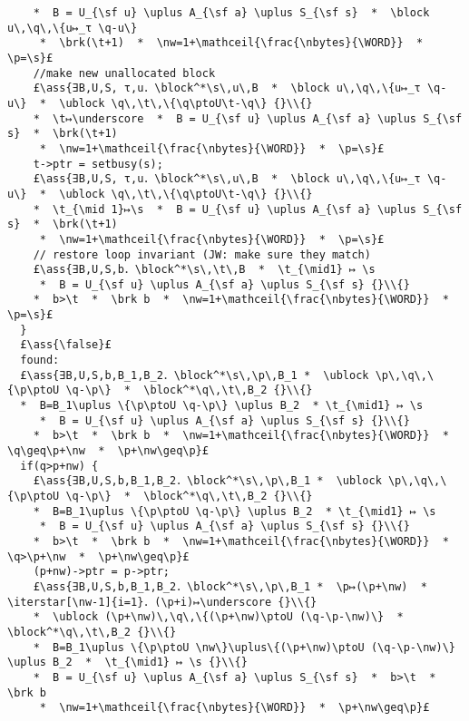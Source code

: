 \documentclass[12pt,a4paper]{article}
\makeatletter
\newcommand{\ml}[2][t]{\mbox{\mdseries\begin{tabular}[#1]{@{}L@{}}#2\end{tabular}}}
\newcommand{\ass}[1]{\ensuremath{{\color{blue}\left\{\ml[c]{#1}\right\}}}}
\newcommand{\iterstar}[2][]{\text{\LARGE $*$}^{#1}_{#2}}
\makeatother
\begin{document}
\begin{lstlisting}
    *  B = U_{\sf u} \uplus A_{\sf a} \uplus S_{\sf s}  *  \block u\,\q\,\{u↦_τ \q-u\} 
     *  \brk(\t+1)  *  \nw=1+\mathceil{\frac{\nbytes}{\WORD}}  *  \p=\s}£
    //make new unallocated block
    £\ass{∃B,U,S, τ,u．\block^*\s\,u\,B  *  \block u\,\q\,\{u↦_τ \q-u\}  *  \ublock \q\,\t\,\{\q\ptoU\t-\q\} {}\\{} 
    *  \t↦\underscore  *  B = U_{\sf u} \uplus A_{\sf a} \uplus S_{\sf s}  *  \brk(\t+1) 
     *  \nw=1+\mathceil{\frac{\nbytes}{\WORD}}  *  \p=\s}£
    t->ptr = setbusy(s);
    £\ass{∃B,U,S, τ,u．\block^*\s\,u\,B  *  \block u\,\q\,\{u↦_τ \q-u\}  *  \ublock \q\,\t\,\{\q\ptoU\t-\q\} {}\\{} 
    *  \t_{\mid 1}↦\s  *  B = U_{\sf u} \uplus A_{\sf a} \uplus S_{\sf s}  *  \brk(\t+1) 
     *  \nw=1+\mathceil{\frac{\nbytes}{\WORD}}  *  \p=\s}£
    // restore loop invariant (JW: make sure they match)
    £\ass{∃B,U,S,b．\block^*\s\,\t\,B  *  \t_{\mid1} ↦ \s 
     *  B = U_{\sf u} \uplus A_{\sf a} \uplus S_{\sf s} {}\\{}
    *  b>\t  *  \brk b  *  \nw=1+\mathceil{\frac{\nbytes}{\WORD}}  *  \p=\s}£
  }
  £\ass{\false}£
  found:
  £\ass{∃B,U,S,b,B_1,B_2．\block^*\s\,\p\,B_1 *  \ublock \p\,\q\,\{\p\ptoU \q-\p\}  *  \block^*\q\,\t\,B_2 {}\\{}
  *  B=B_1\uplus \{\p\ptoU \q-\p\} \uplus B_2  * \t_{\mid1} ↦ \s 
     *  B = U_{\sf u} \uplus A_{\sf a} \uplus S_{\sf s} {}\\{}
    *  b>\t  *  \brk b  *  \nw=1+\mathceil{\frac{\nbytes}{\WORD}}  *  \q\geq\p+\nw  *  \p+\nw\geq\p}£  
  if(q>p+nw) {
    £\ass{∃B,U,S,b,B_1,B_2．\block^*\s\,\p\,B_1 *  \ublock \p\,\q\,\{\p\ptoU \q-\p\}  *  \block^*\q\,\t\,B_2 {}\\{}
    *  B=B_1\uplus \{\p\ptoU \q-\p\} \uplus B_2  * \t_{\mid1} ↦ \s 
     *  B = U_{\sf u} \uplus A_{\sf a} \uplus S_{\sf s} {}\\{}
    *  b>\t  *  \brk b  *  \nw=1+\mathceil{\frac{\nbytes}{\WORD}}  *  \q>\p+\nw  *  \p+\nw\geq\p}£
    (p+nw)->ptr = p->ptr;
    £\ass{∃B,U,S,b,B_1,B_2．\block^*\s\,\p\,B_1 *  \p↦(\p+\nw)  *  \iterstar[\nw-1]{i=1}．(\p+i)↦\underscore {}\\{}
    *  \ublock (\p+\nw)\,\q\,\{(\p+\nw)\ptoU (\q-\p-\nw)\}  *  \block^*\q\,\t\,B_2 {}\\{}
    *  B=B_1\uplus \{\p\ptoU \nw\}\uplus\{(\p+\nw)\ptoU (\q-\p-\nw)\} \uplus B_2  *  \t_{\mid1} ↦ \s {}\\{}
    *  B = U_{\sf u} \uplus A_{\sf a} \uplus S_{\sf s}  *  b>\t  *  \brk b 
     *  \nw=1+\mathceil{\frac{\nbytes}{\WORD}}  *  \p+\nw\geq\p}£

\end{lstlisting}
\end{document}
